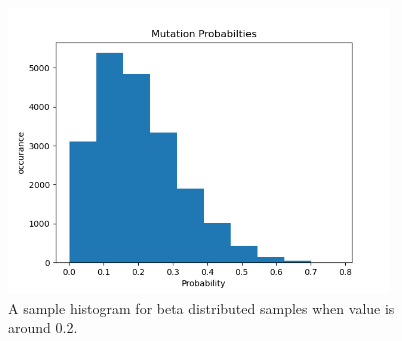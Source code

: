 \documentclass{assignment}
\begin{document}
\begin{figure}[!htb]
    \centering
    \includegraphics[width=0.9\textwidth]{figures/beta_variate.png}
    \caption{A sample histogram for beta distributed samples when value is around 0.2.}
    \label{fig:beta_dist}
\end{figure}
\end{document}

